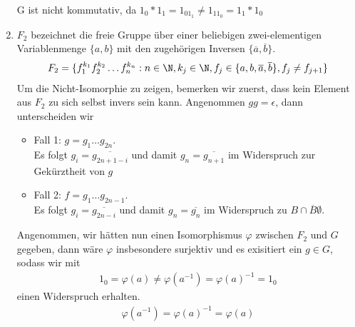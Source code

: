 \begin{solution}
\begin{enumerate}
  G ist nicht kommutativ, da $1_0*1_1 = 1_01_1 \neq 1_11_0 = 1_1*1_0$
  \item $F_2$ bezeichnet die freie Gruppe über einer beliebigen zwei-elementigen
  Variablenmenge $\{a,b\}$ mit den zugehörigen Inversen $\{\overline{a},\overline{b}\}$.
  \begin{align*}
    F_2 = \{f_1^{k_1}f_2^{k_2}\dots f_n^{k_n}: n \in \N,k_j \in \N, f_j \in
    \{a,b,\overline{a},\overline{b}\}, f_j \neq f_{j+1}\}
  \end{align*}
  Um die Nicht-Isomorphie zu zeigen, bemerken wir zuerst, dass kein Element aus $F_2$
  zu sich selbst invers sein kann. Angenommen $gg = \epsilon$, dann unterscheiden wir
  \begin{itemize}
    \item Fall 1: $g = g_1\dots g_{2n}$.\\
    Es folgt $g_i = \overline{g_{2n+1-i}}$ und damit $g_{n} = \overline{g_{n+1}}$
    im Widerspruch zur Gekürztheit von $g$
    \item Fall 2: $f = g_1\dots g_{2n-1}$. \\
    Es folgt $g_i = \overline{g_{2n-i}}$ und damit $g_{n} = \overline{g_n}$
    im Widerspruch zu $B \cap \overline{B} \emptyset$.
  \end{itemize}
  Angenommen, wir hätten nun einen Isomorphismus $\varphi$ zwischen $F_2$ und $G$
  gegeben, dann wäre $\varphi$ insbesondere surjektiv und es exisitiert ein $g \in G$,
  sodass wir mit
  \begin{align*}
    1_0 = \varphi(a) \neq \varphi(a^{-1}) = \varphi(a)^{-1} = 1_0
  \end{align*}
  einen Widerspruch erhalten.
  \begin{align*}
    \varphi(a^{-1}) = \varphi(a)^{-1} = \varphi(a)
  \end{align*}
\end{enumerate}
\end{solution}
